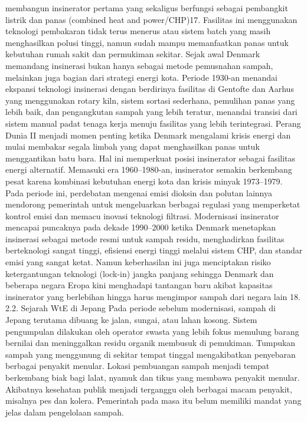 \documentclass[
  letterpaper,
  DIV=11,
  numbers=noendperiod]{scrreprt}
\begin{document}
membangun insinerator pertama yang sekaligus berfungsi sebagai
pembangkit listrik dan panas (combined heat and power/CHP)17. Fasilitas
ini menggunakan teknologi pembakaran tidak terus menerus atau sistem
batch yang masih menghasilkan polusi tinggi, namun sudah mampu
memanfaatkan panas untuk kebutuhan rumah sakit dan permukiman sekitar.
Sejak awal Denmark memandang insinerasi bukan hanya sebagai metode
pemusnahan sampah, melainkan juga bagian dari strategi energi kota.
Periode 1930-an menandai ekspansi teknologi insinerasi dengan berdirinya
fasilitas di Gentofte dan Aarhus yang menggunakan rotary kiln, sistem
sortasi sederhana, pemulihan panas yang lebih baik, dan pengangkutan
sampah yang lebih teratur, menandai transisi dari sistem manual padat
tenaga kerja menuju fasilitas yang lebih terintegrasi. Perang Dunia II
menjadi momen penting ketika Denmark mengalami krisis energi dan mulai
membakar segala limbah yang dapat menghasilkan panas untuk menggantikan
batu bara. Hal ini memperkuat posisi insinerator sebagai fasilitas
energi alternatif. Memasuki era 1960--1980-an, insinerator semakin
berkembang pesat karena kombinasi kebutuhan energi kota dan krisis
minyak 1973--1979. Pada periode ini, perdebatan mengenai emisi dioksin
dan polutan lainnya mendorong pemerintah untuk mengeluarkan berbagai
regulasi yang memperketat kontrol emisi dan memacu inovasi teknologi
filtrasi. Modernisasi insinerator mencapai puncaknya pada dekade
1990--2000 ketika Denmark menetapkan insinerasi sebagai metode resmi
untuk sampah residu, menghadirkan fasilitas berteknologi sangat tinggi,
efisiensi energi tinggi melalui sistem CHP, dan standar emisi yang
sangat ketat. Namun keberhasilan ini juga menciptakan risiko
ketergantungan teknologi (lock-in) jangka panjang sehingga Denmark dan
beberapa negara Eropa kini menghadapi tantangan baru akibat kapasitas
insinerator yang berlebihan hingga harus mengimpor sampah dari negara
lain 18. 2.2. Sejarah WtE di Jepang Pada periode sebelum modernisasi,
sampah di Jepang terutama dibuang ke jalan, sungai, atau lahan kosong.
Sistem pengumpulan dilakukan oleh operator swasta yang lebih fokus
memulung barang bernilai dan meninggalkan residu organik membusuk di
pemukiman. Tumpukan sampah yang menggunung di sekitar tempat tinggal
mengakibatkan penyebaran berbagai penyakit menular. Lokasi pembuangan
sampah menjadi tempat berkembang biak bagi lalat, nyamuk dan tikus yang
membawa penyakit menular. Akibatnya kesehatan publik menjadi terganggu
oleh berbagai macam penyakit, misalnya pes dan kolera. Pemerintah pada
masa itu belum memiliki mandat yang jelas dalam pengelolaan sampah.
\end{document}
